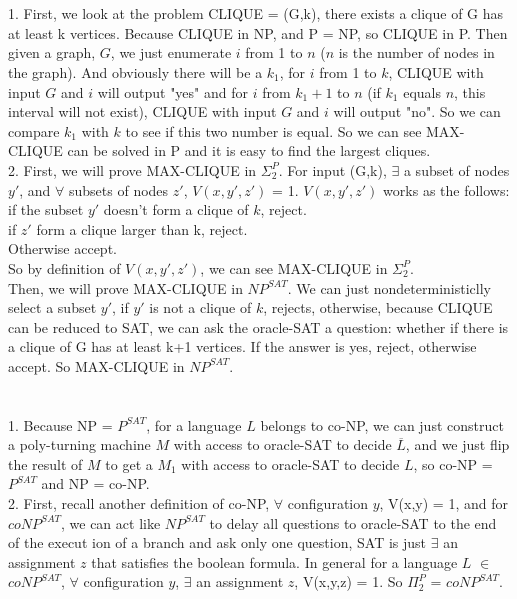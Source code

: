 \documentclass[11pt]{article}
\begin{document}
\part{}
    1. First, we look at the problem CLIQUE = {(G,k), there exists a clique of G has at least k vertices}. Because CLIQUE in NP, and P = NP, so CLIQUE in P. Then given a graph, $G$, we just enumerate $i$ from 1 to $n$ ($n$ is the number of nodes in the graph). And obviously there will be a $k_{1}$, for $i$ from 1 to $k$, CLIQUE with input $G$ and $i$ will output "yes" and for $i$ from $k_{1}+1$ to $n$ (if $k_{1}$ equals $n$, this interval will not exist), CLIQUE with input $G$ and $i$ will output "no". So we can compare $k_{1}$ with $k$ to see if this two number is equal. So we can see MAX-CLIQUE can be solved in P and it is easy to find the largest cliques. \\
    2. First, we will prove MAX-CLIQUE in $\Sigma_{2}^{P}$. 
        For input (G,k), $\exists$ a subset of nodes $y'$, and $\forall$ subsets of nodes $z'$, $V(x, y',z')$ = 1.
        $V(x, y',z')$ works as the follows: \\
        if the subset $y'$ doesn't form a clique of $k$, reject. \\
        if $z'$ form a clique larger than k, reject. \\
        Otherwise accept.\\
        So by definition of $V(x, y',z')$, we can see MAX-CLIQUE in $\Sigma_{2}^{P}$. \\
        Then, we will prove MAX-CLIQUE in $NP^{SAT}$. We can just nondeterministiclly select a subset $y'$, if $y'$ is not a clique of $k$, rejects, otherwise, because CLIQUE can be reduced to SAT, we can ask the oracle-SAT a question: whether if there is a clique of G has at least k+1 vertices. If the answer is yes, reject, otherwise accept. So MAX-CLIQUE in $NP^{SAT}$.
\part{}
    1. Because NP = $P^{SAT}$, for a language $L$ belongs to co-NP, we can just construct a poly-turning machine $M$ with access to oracle-SAT to decide $\overline{L}$, and we just flip the result of $M$ to get a $M_{1}$ with access to oracle-SAT to decide $L$, so co-NP = $P^{SAT}$ and NP = co-NP. \\
    2. First, recall another definition of co-NP, $\forall$ configuration $y$, V(x,y) = 1, and for $coNP^{SAT}$, we can act like $NP^{SAT}$ to delay all questions to oracle-SAT to the end of the execut ion of a branch and ask only one question, SAT is just $\exists$ an assignment $z$ that satisfies the boolean formula. In general for a language $L$ $\in$ $coNP^{SAT}$, $\forall$ configuration $y$, $\exists$ an assignment $z$, V(x,y,z) = 1. So $\Pi_{2}^{P}$ = $coNP^{SAT}$.
\end{document}
